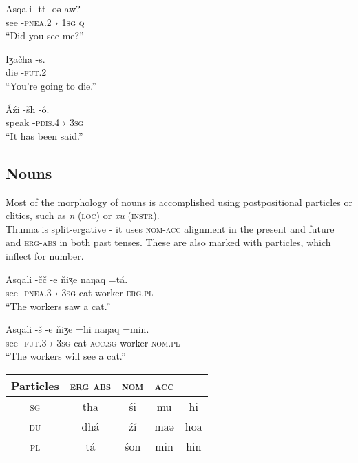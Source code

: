 \documentclass[11pt]{article} %
\begin{document}
\begin{exe}  
  \ex
  \gll Asqali  -tt                -oə          aw?        \\
	   see     -\textsc{pnea.2 ›} \textsc{1sg} \textsc{q} \\
  \glt ``Did you see me?''
  
  \ex
  \gll Iʒačha  -s.              \\
	   die     -\textsc{fut.2}  \\
  \glt ``You're going to die.''
	
  \ex
  \gll Áźi   -šh                -ó.           \\ %
	   speak -\textsc{pdis.4 ›} \textsc{3sg}  \\ %
  \glt ``It has been said.''
\end{exe}

\subsection{Nouns}

Most of the morphology of nouns is accomplished using postpositional particles or clitics, such as \textit{n} (\textsc{loc}) or \textit{xu} (\textsc{instr}).\\
Thunna is split-ergative - it uses \textsc{nom-acc} alignment in the present and future and \textsc{erg-abs} in both past tenses. These are also marked with particles, which inflect for number.
\begin{exe}  
  \ex
  \gll Asqali  -čč                -e           ňiʒe naŋaq  =tá.            \\   %
	   see     -\textsc{pnea.3 ›} \textsc{3sg} cat  worker \textsc{erg.pl} \\
  \glt ``The workers saw a cat.''
  
    \ex
  \gll Asqali  -š                 -e           ňiʒe =hi             naŋaq  =min.            \\            %
	   see     -\textsc{fut.3 ›}  \textsc{3sg} cat  \textsc{acc.sg} worker \textsc{nom.pl} \\
  \glt ``The workers will see a cat.''
\end{exe}

\begin{center}
	\begin{tabular}{|c||c|c|c|c|}
				\hline
				\textbf{Particles} & \textsc{erg} \textsc{abs} & \textsc{nom} & \textsc{acc} \\ \hline\hline
				\textsc{sg}        & tha          & śi         & mu           & hi           \\ \hline
				\textsc{du}        & dhá          & źí         & maə          & hoa          \\ \hline
				\textsc{pl}        & tá           & śon        & min          & hin          \\ \hline 
	\end{tabular} 
\end{center}
\end{document}

